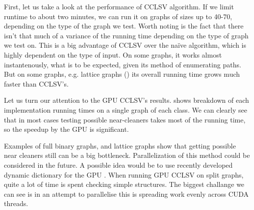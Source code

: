 First, let us take a look at the performance of CCLSV algorithm. If we limit runtime to about two minutes, we can run it on graphs of sizes up to 40-70, depending on the type of the graph we test.  Worth noting is the fact that there isn't that much of a variance of the running time depending on the type of graph we test on. This is a big advantage of CCLSV over the na\"ive algorithm, which is highly dependent on the type of input. On some graphs, it works almost instantenously, what is to be expected, given its method of enumerating paths. But on some graphs, e.g. lattice graphs () its overall running time grows much faster than CCLSV's.

Let us turn our attention to the GPU CCLSV's results.  shows breakdown of each implementation running times on a single graph of each class. We can clearly see that in most cases testing possible near-cleaners takes most of the running time, so the speedup by the GPU is significant. 

Examples of full binary graphs, and lattice graphs show that getting possible near cleaners still can be a big bottleneck. Parallelization of this method could be considered in the future. A possible idea would be to use recently developed dynamic dictionary for the GPU \cite{Ashkiani2018}. When running GPU CCLSV on split graphs, quite a lot of time is spent checking simple structures. The biggest challange we can see is in an attempt to parallelise this is spreading work evenly across CUDA threads.




